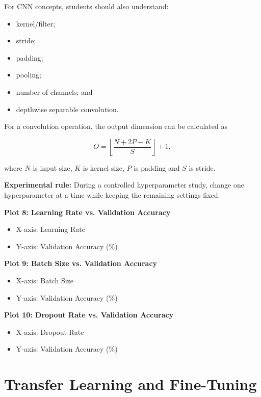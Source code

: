 \documentclass[10pt]{article}
\begin{document}
For CNN concepts, students should also understand:

\begin{itemize}
\item kernel/filter;
\item stride;
\item padding;
\item pooling;
\item number of channels; and
\item depthwise separable convolution.
\end{itemize}

For a convolution operation, the output dimension can be calculated as

\[
O=
\left\lfloor
\frac{N+2P-K}{S}
\right\rfloor+1,
\]

where $N$ is input size, $K$ is kernel size, $P$ is padding and $S$ is
stride.

\textbf{Experimental rule:} During a controlled hyperparameter study,
change one hyperparameter at a time while keeping the remaining settings
fixed.

\textbf{Plot 8: Learning Rate vs. Validation Accuracy}

\begin{itemize}
\item X-axis: Learning Rate
\item Y-axis: Validation Accuracy (\%)
\end{itemize}

\textbf{Plot 9: Batch Size vs. Validation Accuracy}

\begin{itemize}
\item X-axis: Batch Size
\item Y-axis: Validation Accuracy (\%)
\end{itemize}

\textbf{Plot 10: Dropout Rate vs. Validation Accuracy}

\begin{itemize}
\item X-axis: Dropout Rate
\item Y-axis: Validation Accuracy (\%)
\end{itemize}

\section{Transfer Learning and Fine-Tuning}
\end{document}
